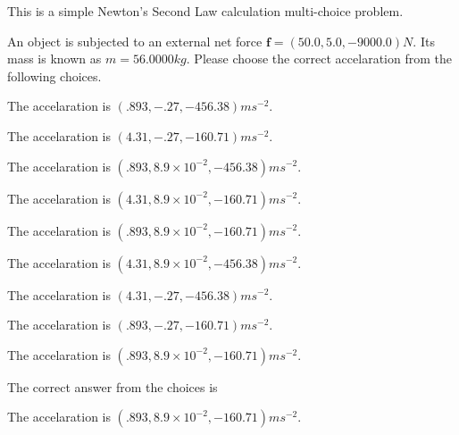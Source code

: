 \documentclass[12pt]{article}
\begin{document}
  


\noindent{}
This is a simple Newton's Second Law calculation multi-choice problem.  
\noindent{}


 
 
An object is subjected to an external net force $\mathbf{f}=
(50.0 , 5.0 , -9000.0) N$.
Its mass is known as $m= %
56.0000 kg$. Please choose the
correct accelaration from the following choices.
 
 
 
The accelaration is $  %
(
.893,
-.27,
-456.38)
ms^{-2} $.
 
 
The accelaration is $  %
(
4.31,
-.27,
-160.71)
ms^{-2} $.
 
 
The accelaration is $  %
(
.893,
8.9 \times 10^{-2},
-456.38)
ms^{-2} $.
 
 
The accelaration is $  %
(
4.31,
8.9 \times 10^{-2},
-160.71)
ms^{-2} $.
 
 
The accelaration is $  %
(
.893,
8.9 \times 10^{-2},
-160.71)
ms^{-2} $.
 
 
The accelaration is $  %
(
4.31,
8.9 \times 10^{-2},
-456.38)
ms^{-2} $.
 
 
The accelaration is $  %
(
4.31,
-.27,
-456.38)
ms^{-2} $.
 
 
The accelaration is $  %
(
.893,
-.27,
-160.71)
ms^{-2} $.
 
 
\noindent{}
 
 
The accelaration is $  %
(
.893,
8.9 \times 10^{-2},
-160.71)
ms^{-2} $.
 
 
\noindent{}
 
 
 
 
 
\noindent{}
 
 

The correct answer from the choices is


The accelaration is $  %
(
.893,
8.9 \times 10^{-2},
-160.71)
ms^{-2} $.
 
\end{document}
